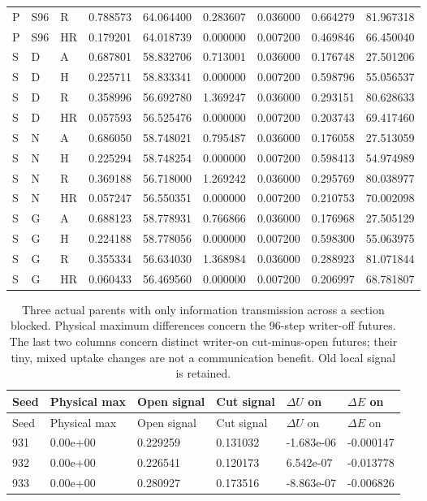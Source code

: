 \begin{longtable}{lllllllll}
P & S96 & R & 0.788573 & 64.064400 & 0.283607 & 0.036000 & 0.664279 & 81.967318\\
P & S96 & HR & 0.179201 & 64.018739 & 0.000000 & 0.007200 & 0.469846 & 66.450040\\
S & D & A & 0.687801 & 58.832706 & 0.713001 & 0.036000 & 0.176748 & 27.501206\\
S & D & H & 0.225711 & 58.833341 & 0.000000 & 0.007200 & 0.598796 & 55.056537\\
S & D & R & 0.358996 & 56.692780 & 1.369247 & 0.036000 & 0.293151 & 80.628633\\
S & D & HR & 0.057593 & 56.525476 & 0.000000 & 0.007200 & 0.203743 & 69.417460\\
S & N & A & 0.686050 & 58.748021 & 0.795487 & 0.036000 & 0.176058 & 27.513059\\
S & N & H & 0.225294 & 58.748254 & 0.000000 & 0.007200 & 0.598413 & 54.974989\\
S & N & R & 0.369188 & 56.718000 & 1.269242 & 0.036000 & 0.295769 & 80.038977\\
S & N & HR & 0.057247 & 56.550351 & 0.000000 & 0.007200 & 0.210753 & 70.002098\\
S & G & A & 0.688123 & 58.778931 & 0.766866 & 0.036000 & 0.176968 & 27.505129\\
S & G & H & 0.224188 & 58.778056 & 0.000000 & 0.007200 & 0.598300 & 55.063975\\
S & G & R & 0.355334 & 56.634030 & 1.368984 & 0.036000 & 0.288923 & 81.071844\\
S & G & HR & 0.060433 & 56.469560 & 0.000000 & 0.007200 & 0.206997 & 68.781807\\
\bottomrule
\end{longtable}
\endgroup

\begingroup\scriptsize\setlength{\tabcolsep}{3pt}
\begin{longtable}{llllll}
\caption{Three actual parents with only information transmission across a section blocked. Physical maximum differences concern the 96-step writer-off futures. The last two columns concern distinct writer-on cut-minus-open futures; their tiny, mixed uptake changes are not a communication benefit. Old local signal is retained.}\label{tab:reach-cut}\\
\toprule
Seed & Physical max & Open signal & Cut signal & $\Delta U$ on & $\Delta E$ on\\
\midrule\endfirsthead
\toprule
Seed & Physical max & Open signal & Cut signal & $\Delta U$ on & $\Delta E$ on\\
\midrule\endhead
931 & 0.00e+00 & 0.229259 & 0.131032 & -1.683e-06 & -0.000147\\
932 & 0.00e+00 & 0.226541 & 0.120173 & 6.542e-07 & -0.013778\\
933 & 0.00e+00 & 0.280927 & 0.173516 & -8.863e-07 & -0.006826\\
\bottomrule
\end{longtable}
\endgroup

